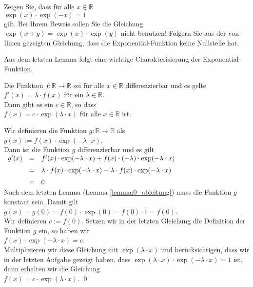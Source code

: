 \exercise
Zeigen Sie, dass f\"ur alle $x\in \mathbb{R}$
\\[0.2cm]
\hspace*{1.3cm}
$\exp(x) \cdot \exp(-x) = 1$ 
\\[0.2cm]
gilt.  Bei Ihrem Beweis sollen Sie die Gleichung $\exp(x+y) = \exp(x) \cdot \exp(y)$ nicht benutzen!
Folgern Sie aus der von Ihnen gezeigten Gleichung, dass die Exponential-Funktion keine Nullstelle hat. \eox
\vspace*{0.3cm}

\noindent
Aus dem letzten Lemma folgt eine wichtige Charakterisierung der Exponential-Funktion.
\begin{Lemma}
Die Funktion $f:\mathbb{R} \rightarrow \mathbb{R}$ sei f\"ur alle $x \in \mathbb{R}$ differenzierbar und es
gelte
\\[0.2cm]
\hspace*{1.3cm}
$f'(x) = \lambda \cdot f(x)$ \quad f\"ur ein $\lambda \in \mathbb{R}$.
\\[0.2cm]
Dann gibt es ein $c \in \mathbb{R}$, so dass
\\[0.2cm]
\hspace*{1.3cm}
$f(x) = c \cdot \exp(\lambda \cdot x)$ \quad f\"ur alle $x \in \mathbb{R}$ ist.
\end{Lemma}

\proof
Wir definieren die Funktion $g: \mathbb{R} \rightarrow \mathbb{R}$ als
\\[0.2cm]
\hspace*{1.3cm}
$g(x) := f(x) \cdot \exp(-\lambda \cdot x)$.
\\[0.2cm]
Dann ist die Funktion $g$ differenzierbar und es gilt
\\[0.2cm]
\hspace*{1.3cm}
$
\begin{array}[t]{lcll}
g'(x) & = & f'(x) \cdot \exp(-\lambda \cdot x) + f(x) \cdot (-\lambda) \cdot \exp(-\lambda \cdot x) 
          \\[0.2cm]
      & = & \lambda \cdot f(x) \cdot \exp(-\lambda \cdot x) - \lambda \cdot f(x) \cdot \exp(-\lambda \cdot x) 
          \\[0.2cm]
      & = & 0
\end{array}
$
\\[0.2cm]
Nach dem letzten Lemma (Lemma \ref{lemma:0_ableitung}) muss die Funktion $g$ konstant sein.  Damit gilt
\\[0.2cm]
\hspace*{1.3cm}
$g(x) = g(0) = f(0) \cdot \exp(0) = f(0) \cdot 1 = f(0)$.
\\[0.2cm]
Wir definieren $c:=f(0)$.  Setzen wir in der letzten Gleichung die Definition der Funktion $g$ ein, so
haben wir
\\[0.2cm]
\hspace*{1.3cm}
$f(x) \cdot \exp(-\lambda \cdot x) = c$.
\\[0.2cm]
Multiplizieren wir diese Gleichung mit $\exp(\lambda \cdot x)$ und ber\"ucksichtigen, dass wir in der
letzten Aufgabe gezeigt haben, dass $\exp(\lambda \cdot x) \cdot \exp(-\lambda \cdot x) = 1$ ist,
dann erhalten wir die Gleichung
\\[0.2cm]
\hspace*{1.3cm}
$f(x) = c \cdot \exp(\lambda \cdot x)$.  \qed

